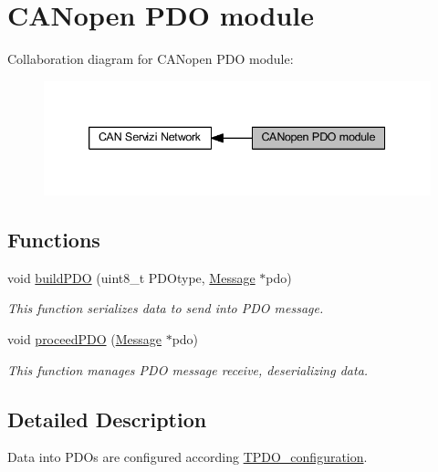 \hypertarget{group___c_a_nopen___p_d_o__module}{}\section{C\+A\+Nopen P\+DO module}
\label{group___c_a_nopen___p_d_o__module}
Collaboration diagram for C\+A\+Nopen P\+DO module\+:\nopagebreak
\begin{figure}[H]
\begin{center}
\leavevmode
\includegraphics[width=339pt]{group___c_a_nopen___p_d_o__module}
\end{center}
\end{figure}
\subsection*{Functions}
\begin{DoxyCompactItemize}
\item 
void \mbox{\hyperlink{group___c_a_nopen___p_d_o__module_gac0ec660dbbba1d5ab27615147f369caf}{build\+P\+DO}} (uint8\+\_\+t P\+D\+Otype, \mbox{\hyperlink{struct_message}{Message}} $\ast$pdo)
\begin{DoxyCompactList}\small\item\em This function serializes data to send into P\+DO message. \end{DoxyCompactList}\item 
void \mbox{\hyperlink{group___c_a_nopen___p_d_o__module_ga91f92516824d9dc33dc8cf83b34726e1}{proceed\+P\+DO}} (\mbox{\hyperlink{struct_message}{Message}} $\ast$pdo)
\begin{DoxyCompactList}\small\item\em This function manages P\+DO message receive, deserializing data. \end{DoxyCompactList}\end{DoxyCompactItemize}


\subsection{Detailed Description}
Data into P\+D\+Os are configured according \mbox{\hyperlink{_c_a_n_network_page_TPDO_configuration}{T\+P\+D\+O\+\_\+configuration}}. 

